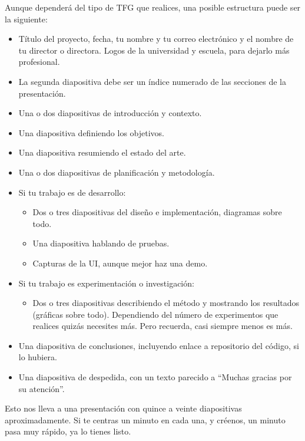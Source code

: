 Aunque dependerá del tipo de TFG que realices, una posible estructura puede ser la siguiente:
\begin{itemize}
\item Título del proyecto, fecha, tu nombre y tu correo electrónico y el nombre de tu director o directora. Logos de la universidad y escuela, para dejarlo más profesional.
\item La segunda diapositiva debe ser un índice numerado de las secciones de la presentación.
\item Una o dos diapositivas de introducción y contexto.
\item Una diapositiva definiendo los objetivos.
\item Una diapositiva resumiendo el estado del arte.
\item Una o dos diapositivas de planificación y metodología.
\item Si tu trabajo es de desarrollo:
    \begin{itemize}
    \item Dos o tres diapositivas del diseño e implementación, diagramas sobre todo.
    \item Una diapositiva hablando de pruebas.
    \item Capturas de la UI, aunque mejor haz una demo.
    \end{itemize}
\item Si tu trabajo es experimentación o investigación:
    \begin{itemize}
        \item Dos o tres diapositivas describiendo el método y mostrando los resultados (gráficas sobre todo). Dependiendo del número de experimentos que realices quizás necesites más. Pero recuerda, casi siempre menos es más.
    \end{itemize}
\item Una diapositiva de conclusiones, incluyendo enlace a repositorio del código, si lo hubiera.
\item Una diapositiva de despedida, con un texto parecido a ``Muchas gracias por su atención''.
\end{itemize}

Esto nos lleva a una presentación con quince a veinte diapositivas aproximadamente. Si te centras un minuto en cada una, y créenos, un minuto pasa muy rápido, ya lo tienes listo.

